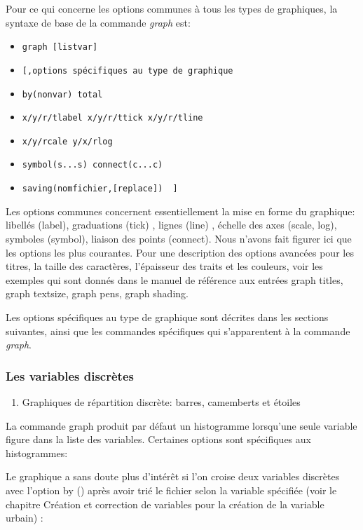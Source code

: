 \documentclass[
]{book}
\providecommand{\tightlist}{%
  \setlength{\itemsep}{0pt}\setlength{\parskip}{0pt}}
\begin{document}
Pour ce qui concerne les options communes à tous les types de
graphiques, la syntaxe de base de la commande \emph{graph} est:

\begin{itemize}
\tightlist
\item
  \texttt{graph\ {[}listvar{]}}
\item
  \texttt{{[},options\ spécifiques\ au\ type\ de\ graphique}
\item
  \texttt{by(nonvar)\ total}
\item
  \texttt{x/y/r/tlabel\ x/y/r/ttick\ x/y/r/tline}
\item
  \texttt{x/y/rcale\ y/x/rlog}
\item
  \texttt{symbol(s...s)\ connect(c...c)}
\item
  \texttt{saving(nomfichier,{[}replace{]})\ \ {]}}
\end{itemize}

Les options communes concernent essentiellement la mise en
forme du graphique: libellés (label), graduations (tick) , lignes
(line) , échelle des axes (scale, log), symboles (symbol), liaison
des points (connect). Nous n'avons fait figurer ici que les
options les plus courantes. Pour une description des options
avancées pour les titres, la taille des caractères, l'épaisseur des
traits et les couleurs, voir les exemples qui sont donnés dans le
manuel de référence aux entrées graph titles, graph textsize,
graph pens, graph shading.

Les options spécifiques au type de graphique sont décrites dans
les sections suivantes, ainsi que les commandes spécifiques qui
s'apparentent à la commande \emph{graph}.

\hypertarget{les-variables-discruxe8tes}{%
\subsubsection{Les variables discrètes}\label{les-variables-discruxe8tes}}

\begin{enumerate}
\def\labelenumi{(\arabic{enumi})}
\tightlist
\item
  Graphiques de répartition discrète: barres, camemberts et étoiles
\end{enumerate}

La commande graph produit par défaut un histogramme
lorsqu'une seule variable figure dans la liste des variables.
Certaines options sont spécifiques aux histogrammes:

Le graphique a sans doute plus d'intérêt si l'on croise deux
variables discrètes avec l'option by () après avoir trié le fichier
selon la variable spécifiée (voir le chapitre Création et
correction de variables pour la création de la variable urbain) :
\end{document}
